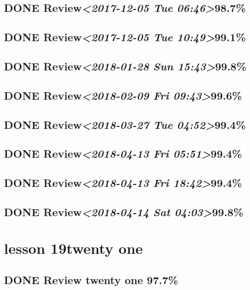 \documentclass[11pt]{ctexart}
\begin{document}
\subsection{{\bfseries\sffamily DONE} Review\textit{<2017-12-05 Tue 06:46>}98.7\%}
\label{sec:org7e008fe}
\subsection{{\bfseries\sffamily DONE} Review\textit{<2017-12-05 Tue 10:49>}99.1\%}
\label{sec:org9f50154}
\subsection{{\bfseries\sffamily DONE} Review\textit{<2018-01-28 Sun 15:43>}99.8\%}
\label{sec:org6c19670}
\subsection{{\bfseries\sffamily DONE} Review\textit{<2018-02-09 Fri 09:43>}99.6\%}
\label{sec:orgd158882}
\subsection{{\bfseries\sffamily DONE} Review\textit{<2018-03-27 Tue 04:52>}99.4\%}
\label{sec:org86cb7cd}
\subsection{{\bfseries\sffamily DONE} Review\textit{<2018-04-13 Fri 05:51>}99.4\%}
\label{sec:org41def3b}
\subsection{{\bfseries\sffamily DONE} Review\textit{<2018-04-13 Fri 18:42>}99.4\%}
\label{sec:org18a48e9}
\subsection{{\bfseries\sffamily DONE} Review\textit{<2018-04-14 Sat 04:03>}99.8\%}
\label{sec:orge872ef1}
\section{lesson 19twenty one}
\label{sec:org2023212}
\subsection{{\bfseries\sffamily DONE} Review twenty one 97.7\%}
\label{sec:org1e5def7}
\end{document}
